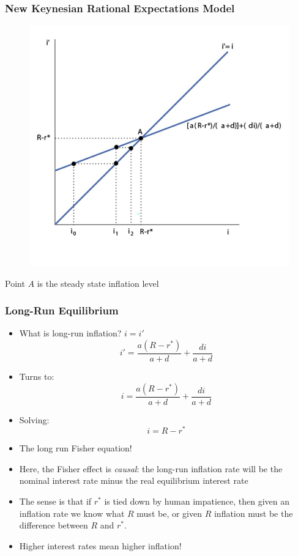 \documentclass{beamer}
\begin{document}
\begin{frame}
\frametitle[alignment=center]{New Keynesian Rational Expectations Model}
\begin{figure}
\centering
\includegraphics[scale=0.5]{Figures/W_Fig_15pt8.png}
\end{figure}
 Point $A$ is the steady state inflation level
\end{frame}


\begin{frame}
\frametitle[alignment=center]{Long-Run Equilibrium}
\begin{itemize}
\item What is long-run inflation? $i=i'$
$$i'=\frac{a(R-r^*)}{a+d}+\frac{di}{a+d}$$
\item Turns to:
$$i=\frac{a(R-r^*)}{a+d}+\frac{di}{a+d}$$
\item Solving:
$$i=R-r^*$$
\item The long run Fisher equation!  
\bigskip
\item Here, the Fisher effect is \emph{causal}: the long-run inflation rate will be the nominal interest rate minus the real equilibrium interest rate
\bigskip
\item The sense is that if $r^*$ is tied down by human impatience, then given an inflation rate we know what $R$ must be, or given $R$ inflation must be the difference between $R$ and $r^*$.
\bigskip
\item Higher interest rates mean higher inflation!
\end{itemize}
\end{frame}
\end{document}
